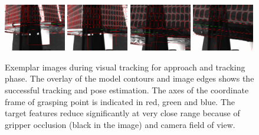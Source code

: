 %
\begin{figure}
\centering\includegraphics[angle=0,width=0.24\textwidth]{./figures/frame0786_result_cam0}
\centering\includegraphics[angle=0,width=0.24\textwidth]{./figures/frame0849_result_cam0}
\centering\includegraphics[angle=0,width=0.24\textwidth]{./figures/frame0922_result_cam0}
\centering\includegraphics[angle=0,width=0.24\textwidth]{./figures/frame0954_result_cam0}
\caption{Exemplar images during visual tracking for approach and tracking phase. The overlay of the model contours and image edges shows the successful tracking and pose estimation. The axes of the coordinate frame of grasping point is indicated in red, green and blue. The target features reduce significantly at very close range because of gripper occlusion (black in the image) and camera field of view.}
\label{fig:TrackingImages}
\end{figure}



